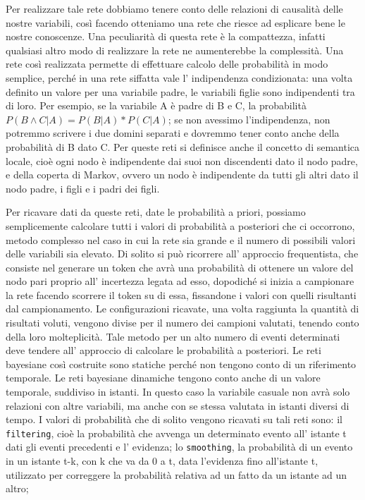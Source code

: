 		Per realizzare tale rete dobbiamo tenere conto delle relazioni di causalità delle nostre variabili, così facendo otteniamo una rete che riesce ad esplicare bene le nostre conoscenze. Una peculiarità di questa rete è la compattezza, infatti qualsiasi altro modo di realizzare la rete ne aumenterebbe la complessità. Una rete così realizzata permette di effettuare calcolo delle probabilità in modo semplice, perché  in una rete siffatta vale l' indipendenza condizionata: una volta definito un valore per una variabile padre, le variabili figlie sono indipendenti tra di loro. Per esempio, se la variabile A è padre di B e C, la probabilità $P(B\wedge C|A)=P(B|A)*P(C|A)$; se non avessimo l'indipendenza, non potremmo scrivere i due domini separati e dovremmo tener conto anche della probabilità di B dato C. Per queste reti si definisce anche il concetto di semantica locale, cioè ogni nodo è indipendente dai suoi non discendenti dato il nodo padre, e della coperta di Markov, ovvero un nodo è indipendente da tutti gli altri dato il nodo padre, i figli e i padri dei figli.
		\par  
		Per ricavare dati da queste reti, date le probabilità a priori, possiamo semplicemente calcolare tutti i valori di probabilità a posteriori che ci occorrono, metodo complesso nel caso in cui la rete sia grande e il numero di possibili valori delle variabili sia elevato. Di solito si può ricorrere all' approccio frequentista, che consiste nel generare un token che avrà una probabilità di ottenere un valore del nodo pari proprio all' incertezza legata ad esso, dopodiché si inizia a campionare la rete facendo scorrere il token su di essa, fissandone i valori con quelli risultanti dal campionamento. Le configurazioni ricavate, una volta raggiunta la quantità di risultati voluti, vengono divise per il numero dei campioni valutati, tenendo conto della loro molteplicità. Tale metodo per un alto numero di eventi determinati deve tendere all' approccio di calcolare le probabilità a posteriori. Le reti bayesiane così costruite sono statiche perché non tengono conto di un riferimento temporale. Le reti bayesiane dinamiche tengono conto anche di un valore temporale, suddiviso in istanti. In questo caso la variabile casuale non avrà solo relazioni con altre variabili, ma anche con se stessa valutata in istanti diversi di tempo. I valori di probabilità che di solito vengono ricavati su tali reti sono: il \texttt{filtering}, cioè la probabilità che avvenga un determinato evento all' istante t dati gli eventi precedenti e l' evidenza; lo \texttt{smoothing}, la probabilità di un evento in un istante t-k, con k che va da 0 a t, data l'evidenza fino all'istante t, utilizzato per correggere la probabilità relativa ad un fatto da un istante ad un altro;
